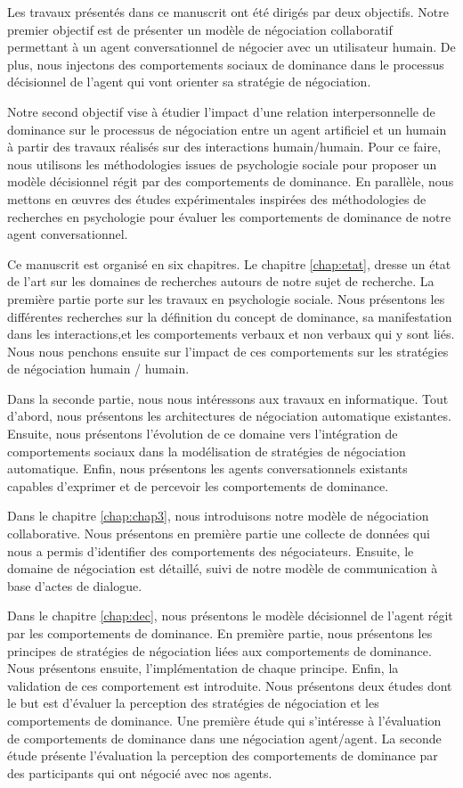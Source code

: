 Les travaux présentés dans ce manuscrit ont été dirigés	par deux objectifs. 
Notre premier objectif est de présenter un modèle de négociation collaboratif permettant à un agent conversationnel de négocier avec un utilisateur humain. De plus, nous injectons des comportements sociaux de dominance dans le processus décisionnel de l'agent qui vont orienter sa stratégie de négociation.

Notre second objectif vise à étudier l'impact d'une relation interpersonnelle de dominance sur le processus de négociation entre un agent artificiel et un humain à partir des travaux réalisés sur des interactions humain/humain.
Pour ce faire, nous utilisons les méthodologies issues de psychologie sociale pour proposer un modèle décisionnel régit par des comportements de dominance. En parallèle, nous mettons en œuvres des études expérimentales inspirées des méthodologies de recherches en psychologie pour évaluer les comportements de dominance de notre agent conversationnel.  


Ce manuscrit est organisé en six chapitres.
Le chapitre \ref{chap:etat}, dresse un état de l'art sur les domaines de recherches autours de notre sujet de recherche. La première partie porte sur les travaux en psychologie sociale. Nous présentons les différentes recherches sur la définition du concept de dominance, sa manifestation dans les interactions,et les comportements verbaux et non verbaux qui y sont liés. Nous nous penchons ensuite sur l'impact de ces comportements sur les stratégies de négociation humain / humain. 

Dans la seconde partie, nous nous intéressons aux travaux en informatique. Tout d'abord, nous présentons les architectures de négociation automatique existantes. Ensuite, nous présentons l'évolution de ce domaine vers l'intégration de comportements sociaux dans la modélisation de stratégies de négociation automatique. Enfin, nous présentons les agents conversationnels existants capables d'exprimer et de percevoir les comportements de dominance. 

Dans le chapitre \ref{chap:chap3}, nous introduisons notre modèle de négociation collaborative. Nous présentons en première partie une collecte de données qui nous a permis d'identifier des comportements des négociateurs. Ensuite, le domaine de négociation est détaillé, suivi de notre modèle de communication à base d'actes de dialogue. 

Dans le chapitre \ref{chap:dec}, nous présentons le modèle décisionnel de l'agent régit par les comportements de dominance. En première partie, nous présentons les principes de stratégies de négociation liées aux comportements de dominance. Nous présentons ensuite, l'implémentation de chaque principe. Enfin, la validation de ces comportement est introduite. Nous présentons deux études dont le but est d'évaluer la perception des stratégies de négociation et les comportements de dominance. Une première étude qui s'intéresse à l'évaluation de comportements de dominance dans une négociation agent/agent. La seconde étude présente l'évaluation la perception des comportements de dominance par des participants qui ont négocié avec nos agents.

